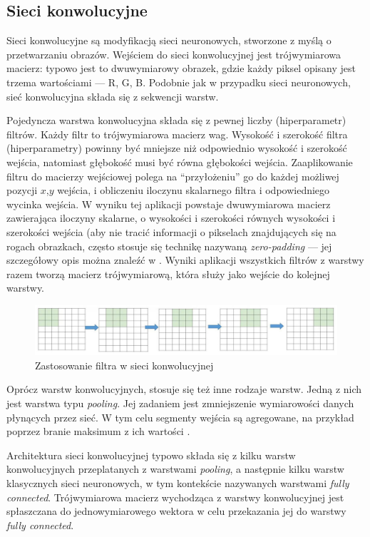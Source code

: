 \subsection{Sieci konwolucyjne}
\label{subsec:cnn}

Sieci konwolucyjne są modyfikacją sieci neuronowych, stworzone z myślą o przetwarzaniu obrazów. Wejściem do sieci konwolucyjnej jest trójwymiarowa macierz: typowo jest to dwuwymiarowy obrazek, gdzie każdy piksel opisany jest trzema wartościami --- R, G, B. Podobnie jak w przypadku sieci neuronowych, sieć konwolucyjna składa się z sekwencji warstw.

Pojedyncza warstwa konwolucyjna składa się z pewnej liczby (hiperparametr) filtrów. Każdy filtr to trójwymiarowa macierz wag. Wysokość i szerokość filtra (hiperparametry) powinny być mniejsze niż odpowiednio wysokość i szerokość wejścia, natomiast głębokość musi być równa głębokości wejścia. Zaaplikowanie filtru do macierzy wejściowej polega na “przyłożeniu” go do każdej możliwej pozycji $x$,$y$ wejścia, i obliczeniu iloczynu skalarnego filtra i odpowiedniego wycinka wejścia. W wyniku tej aplikacji powstaje dwuwymiarowa macierz zawierająca iloczyny skalarne, o wysokości i szerokości równych wysokości i szerokości wejścia (aby nie tracić informacji o pikselach znajdujących się na rogach obrazkach, często stosuje się technikę nazywaną \textit{zero-padding} --- jej szczegółowy opis można znaleźć w \cite{albawi2017understanding}. Wyniki aplikacji wszystkich filtrów z warstwy razem tworzą macierz trójwymiarową, która służy jako wejście do kolejnej warstwy.

\begin{figure}[H]
	\centering
	\includegraphics[width=0.8\linewidth]{images/chapter2/filter.pdf}
	\caption{Zastosowanie filtra w sieci konwolucyjnej \cite{albawi2017understanding}}
	\label{fig:filter}
\end{figure}

\noindent Oprócz warstw konwolucyjnych, stosuje się też inne rodzaje warstw. Jedną z nich jest warstwa typu \textit{pooling}. Jej zadaniem jest zmniejszenie wymiarowości danych płynących przez sieć. W tym celu segmenty wejścia są agregowane, na przykład poprzez branie maksimum z ich wartości \cite{albawi2017understanding}.

Architektura sieci konwolucyjnej typowo składa się z kilku warstw konwolucyjnych przeplatanych z warstwami \textit{pooling}, a następnie kilku warstw klasycznych sieci neuronowych, w tym kontekście nazywanych warstwami \textit{fully connected}. Trójwymiarowa macierz wychodząca z warstwy konwolucyjnej jest spłaszczana do jednowymiarowego wektora w celu przekazania jej do warstwy \textit{fully connected}.

